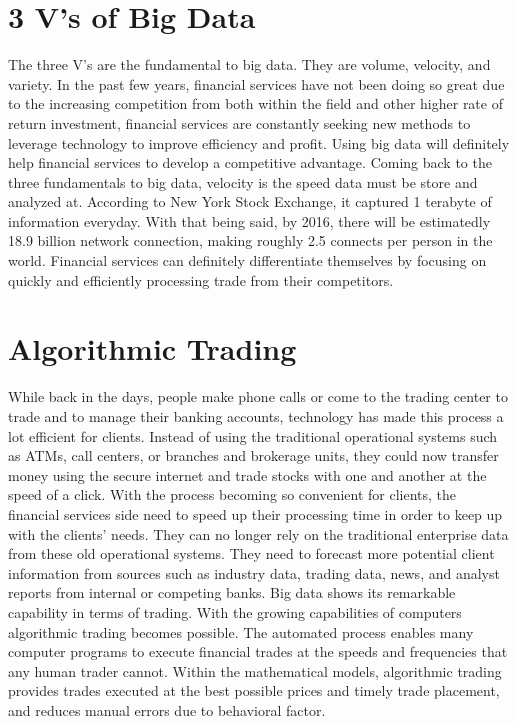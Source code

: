 \documentclass[sigconf]{acmart}
\begin{document}
\section{3 V's of Big Data}
The three V's are the fundamental to big data. They are volume, velocity, and variety. \cite{Nath2015} In the past few years, financial services have not been doing so great due to the increasing competition from both within the field and other higher rate of return investment, financial services are constantly seeking new methods to leverage technology to improve efficiency and profit. Using big data will definitely help financial services to develop a competitive advantage. \cite{Nath2015} Coming back to the three fundamentals to big data, velocity is the speed data must be store and analyzed at. According to New York Stock Exchange, it captured 1 terabyte of information everyday. With that being said, by 2016, there will be estimatedly 18.9 billion network connection, making roughly 2.5 connects per person in the world. Financial services can definitely differentiate themselves by focusing on quickly and efficiently processing trade from their competitors.\cite{Turner2013}


\section{Algorithmic Trading}
While back in the days, people make phone calls or come to the trading center to trade and to manage their banking accounts, technology has made this process a lot efficient for clients. Instead of using the traditional operational systems such as ATMs, call centers, or branches and brokerage units, they could now transfer money using the secure internet and trade stocks with one and another at the speed of a click. With the process becoming so convenient for clients, the financial services side need to speed up their processing time in order to keep up with the clients' needs. They can no longer rely on the traditional enterprise data from these old operational systems. They need to forecast more potential client information from sources such as industry data, trading data, news, and analyst reports from internal or competing banks.\cite{Brett2012} Big data shows its remarkable capability in terms of trading. With the growing capabilities of computers algorithmic trading becomes possible. The automated process enables many computer programs to execute financial trades at the speeds and frequencies that any human trader cannot. Within the mathematical models, algorithmic trading provides trades executed at the best possible prices and timely trade placement, and reduces manual errors due to behavioral factor.\cite{Turner2013}
\end{document}
